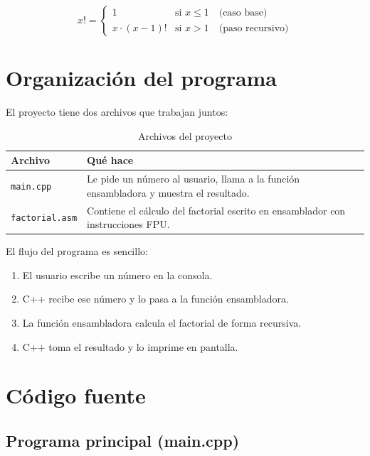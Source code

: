 \documentclass[12pt, letterpaper]{article}
\begin{document}
\begin{equation}
    x! =
    \begin{cases}
        1               & \text{si } x \leq 1 \quad \text{(caso base)} \\
        x \cdot (x-1)! & \text{si } x > 1 \quad \text{(paso recursivo)}
    \end{cases}
\end{equation}

\section{Organización del programa}

El proyecto tiene dos archivos que trabajan juntos:

\begin{table}[H]
    \centering
    \caption{Archivos del proyecto}
    \begin{tabular}{@{}lp{9cm}@{}}
        \toprule
        \textbf{Archivo} & \textbf{Qué hace} \\
        \midrule
        \texttt{main.cpp}      & Le pide un número al usuario, llama a la función ensambladora y muestra el resultado. \\
        \texttt{factorial.asm} & Contiene el cálculo del factorial escrito en ensamblador con instrucciones FPU. \\
        \bottomrule
    \end{tabular}
\end{table}

El flujo del programa es sencillo:

\begin{enumerate}
    \item El usuario escribe un número en la consola.
    \item C++ recibe ese número y lo pasa a la función ensambladora.
    \item La función ensambladora calcula el factorial de forma recursiva.
    \item C++ toma el resultado y lo imprime en pantalla.
\end{enumerate}

\section{Código fuente}

\subsection{Programa principal (main.cpp)}
\end{document}
